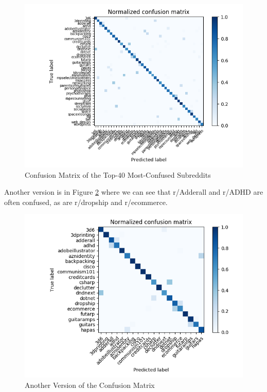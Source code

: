 \documentclass{sig-alternate-05-2015}
\begin{document}
\begin{figure}[H]
\centering
\includegraphics[width=\linewidth]{plots/confusion-matrix-top-confused-labels-all.png}
\caption{Confusion Matrix of the Top-40 Most-Confused Subreddits}
\label{fig:confusionMatrix1}
\end{figure}

Another version is in Figure \ref{fig:confusionMatrix2} where we can see that r/Adderall and r/ADHD are often confused, as are r/dropship and r/ecommerce.

\begin{figure}[H]
\centering
\includegraphics[width=\linewidth]{plots/confusion-matrix-top-confused-labels-0-to-20.png}
\caption{Another Version of the Confusion Matrix}
\label{fig:confusionMatrix2}
\end{figure}
\end{document}
